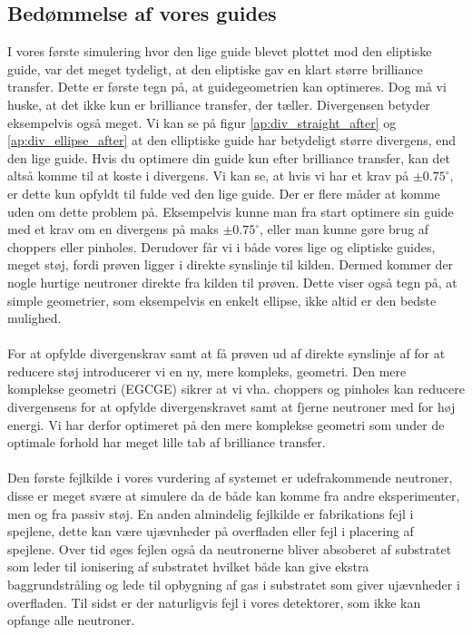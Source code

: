 \documentclass[12pt,oneside,a4paper]{article}
\begin{document}
{{{{{\subsection{Bedømmelse af vores guides}
I vores første simulering hvor den lige guide blevet plottet mod den eliptiske guide, var det meget tydeligt, at den eliptiske gav en klart større brilliance transfer. Dette er første tegn på, at guidegeometrien kan optimeres. Dog må vi huske, at det ikke kun er brilliance transfer, der tæller. Divergensen betyder eksempelvis også meget. Vi kan se på figur \ref{ap:div_straight_after} og \ref{ap:div_ellipse_after} at den elliptiske guide har betydeligt større divergens, end den lige guide. Hvis du optimere din guide kun efter brilliance transfer, kan det altså komme til at koste i divergens. Vi kan se, at hvis vi har et krav på $\pm 0.75^\circ$, er dette kun opfyldt til fulde ved den lige guide. Der er flere måder at komme uden om dette problem på. Eksempelvis kunne man fra start optimere sin guide med et krav om en divergens på maks  $\pm 0.75^\circ$, eller man kunne gøre brug af choppers eller pinholes. Derudover får vi i både vores lige og eliptiske guides, meget støj, fordi prøven ligger i direkte synslinje til kilden. Dermed kommer der nogle hurtige neutroner direkte fra kilden til prøven. Dette viser også tegn på, at simple geometrier, som eksempelvis en enkelt ellipse, ikke altid er den bedste mulighed.
\\
\\
For at opfylde divergenskrav samt at få prøven ud af direkte synslinje af for at reducere støj introducerer vi en ny, mere kompleks, geometri. Den mere komplekse geometri (EGCGE) sikrer at vi vha. choppers og pinholes kan reducere divergensens for at opfylde divergenskravet samt at fjerne neutroner med for høj energi. Vi har derfor optimeret på den mere komplekse geometri som under de optimale forhold har meget lille tab af brilliance transfer.
\\
\\
Den første fejlkilde i vores vurdering af systemet er udefrakommende neutroner, disse er meget svære at simulere da de både kan komme fra andre eksperimenter, men og fra passiv støj. En anden almindelig fejlkilde er fabrikations fejl i spejlene, dette kan være ujævnheder på overfladen eller fejl i placering af spejlene. Over tid øges fejlen også da neutronerne bliver absoberet af substratet som leder til ionisering af substratet hvilket både kan give ekstra baggrundstråling og lede til opbygning af gas i substratet som giver ujævnheder i overfladen. Til sidst er der naturligvis fejl i vores detektorer, som ikke kan opfange alle neutroner.
}}}}}
\end{document}
